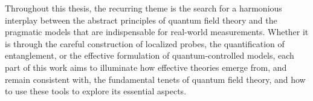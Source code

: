 \documentclass[letterpaper,12pt,titlepage,oneside,final]{book}
\begin{document}
Throughout this thesis, the recurring theme is the search for a harmonious interplay between the abstract principles of quantum field theory and the pragmatic models that are indispensable for real-world measurements. Whether it is through the careful construction of localized probes, the quantification of entanglement, or the effective formulation of quantum-controlled models, each part of this work aims to illuminate how effective theories emerge from, and remain consistent with, the fundamental tenets of quantum field theory, and how to use these tools to explore its essential aspects.




{\color{DarkGray}


}









\end{document}
